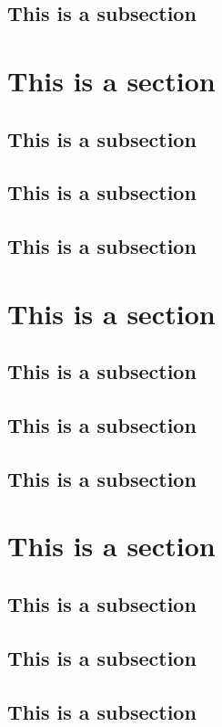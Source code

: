 \documentclass[11pt,oneside]{book}
\begin{document}
\subsection{This is a subsection}

\section{This is a section}

\subsection{This is a subsection}
\subsection{This is a subsection}
\subsection{This is a subsection}

\section{This is a section}

\subsection{This is a subsection}
\subsection{This is a subsection}
\subsection{This is a subsection}

\section{This is a section}

\subsection{This is a subsection}
\subsection{This is a subsection}
\subsection{This is a subsection}
\end{document}
